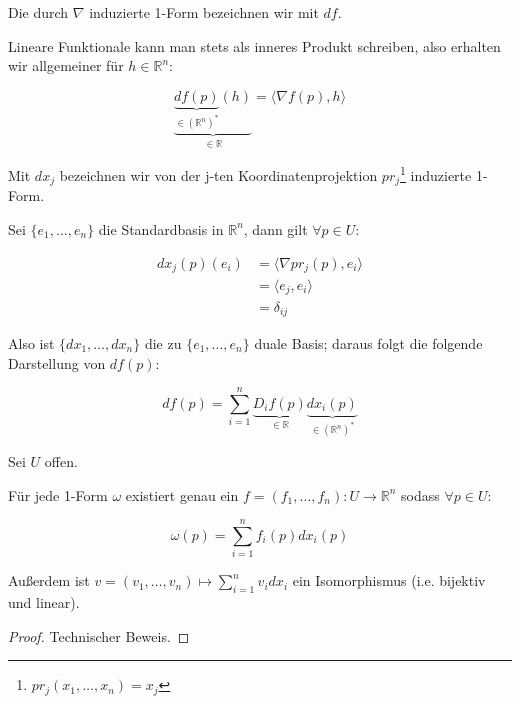 \begin{definition}
	Die durch $\nabla$ induzierte 1-Form bezeichnen wir mit $df$.
\end{definition}


\begin{remark}	
	Lineare Funktionale kann man stets als inneres Produkt schreiben, also erhalten wir allgemeiner f\"ur $h \in \mathbb R^n$:
	
	$$\underbrace{\underbrace{df(p)}_{\in (\mathbb R^n)^*}(h)}_{\in \mathbb R} = \langle \nabla f(p),h\rangle$$
\end{remark}

\begin{definition}[Basis]
	Mit $dx_j$ bezeichnen wir von der j-ten Koordinatenprojektion $pr_j$\footnote{$pr_j(x_1,\dots,x_n) = x_j$} induzierte 1-Form.
\end{definition}

\begin{remark}[Dualit\"at]
	Sei $\{e_1,\dots,e_n\}$ die Standardbasis in $\mathbb R^n$, dann gilt $\forall p \in U$:
	
	\begin{equation*}\begin{aligned}
		dx_j(p)(e_i) &= \langle \nabla pr_j(p), e_i \rangle\\
					 &= \langle e_j, e_i \rangle \\&= \delta_{ij}
	\end{aligned}\end{equation*}

	Also ist $\{dx_1,\dots,dx_n\}$ die zu $\{e_1,\dots,e_n\}$ duale Basis; daraus folgt die folgende Darstellung von $df(p)$:
	
		$$df(p) = \sum_{i=1}^n \underbrace{D_i f(p)}_{\in \mathbb R}\underbrace{dx_i(p)}_{\in (\mathbb R^n)^*}$$
\end{remark}

\begin{proposition}
	Sei $U$ offen.
	
	F\"ur jede 1-Form $\omega$ existiert genau ein $f=(f_1,\dots,f_n): U\rightarrow \mathbb R^n$ sodass $\forall p\in U$:
	
	\begin{equation}\label{eq:1formAlsKomponentenfunktionen}
		\omega(p) = \sum_{i=1}^n f_i(p) dx_i(p)
	\end{equation}

	
	Au\ss erdem ist $v=(v_1,\dots,v_n) \mapsto \sum_{i=1}^n v_i dx_i$  ein Isomorphismus (i.e. bijektiv und linear).
\end{proposition}
\begin{proof}
	Technischer Beweis.
\end{proof}

